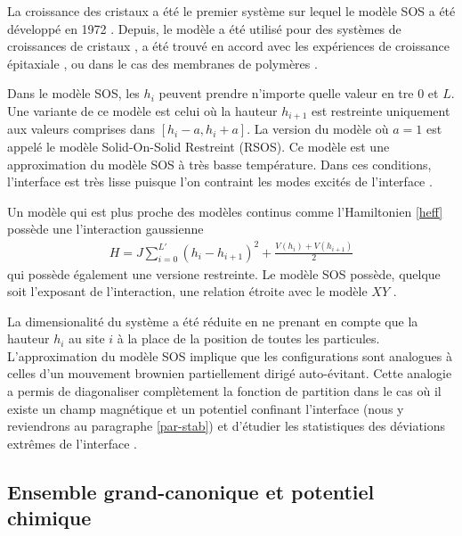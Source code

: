 La croissance des cristaux a été le premier système sur lequel le modèle SOS a été développé en 1972 \cite{gilmer_simulation_1972}. Depuis, le modèle a été utilisé pour des systèmes de croissances de cristaux \cite{elwenspoek_kinetic_1987}, a été trouvé en accord avec les expériences de croissance épitaxiale \cite{wilby_scaling_1992}, ou dans le cas des membranes de polymères \cite{gompper_steric_1989}.

Dans le modèle SOS, les $h_i$ peuvent prendre n'importe quelle valeur en tre $0$ et $L$. Une variante de ce modèle est celui où la hauteur $h_{i+1}$ est restreinte uniquement aux valeurs comprises dans $[h_i-a,h_i+a]$. La version du modèle où $a=1$ est appelé le modèle Solid-On-Solid Restreint (RSOS)\cite{privman_transfer-matrix_1989}. Ce modèle est une approximation du modèle SOS à très basse température.  Dans ces conditions, l'interface est très lisse puisque l'on contraint les modes excités de l'interface \cite{kim_conserved_1994,vaysburd_critical_1995}. 

Un modèle qui est plus proche des modèles continus comme l'Hamiltonien \ref{heff} possède une l'interaction gaussienne
\begin{align}
    H = J \sum_{i=0}^{L'} (h_i-h_{i+1})^2 + \frac{V(h_i)+V(h_{i+1})}{2}
    \label{hamil-gsos}
\end{align}
qui possède également une versione restreinte. Le modèle SOS possède, quelque soit l'exposant de l'interaction, une relation étroite avec le modèle $XY$ \cite{knops_exact_1977}.

La dimensionalité du système a été réduite en ne prenant en compte que la hauteur $h_i$ au site $i$ à la place de la position de toutes les particules. L'approximation du modèle SOS implique que les configurations sont analogues à celles d'un mouvement brownien partiellement dirigé auto-évitant. Cette analogie a permis de diagonaliser complètement la fonction de partition dans le cas où il existe un champ magnétique et un potentiel confinant l'interface (nous y reviendrons au paragraphe \ref{par-stab}) \cite{owczarek_exact_1993} et d'étudier les statistiques des déviations extrêmes de l'interface \cite{majumdar_airy_2005,schehr_universal_2006}.

	\subsection{Ensemble grand-canonique et potentiel chimique}
	\label{subsec-c-gc}

